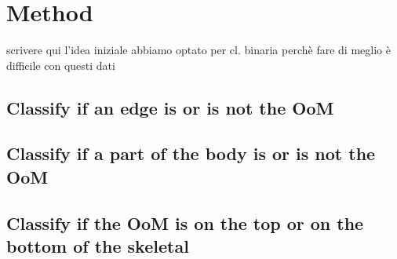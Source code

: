 \section{Method}

scrivere qui l'idea iniziale
abbiamo optato per cl. binaria perchè fare di meglio è difficile con questi dati


\subsection{Classify if an edge is or is not the OoM}

\subsection{Classify if a part of the body is or is not the OoM}

\subsection{Classify if the OoM is on the top or on the bottom of the skeletal}



